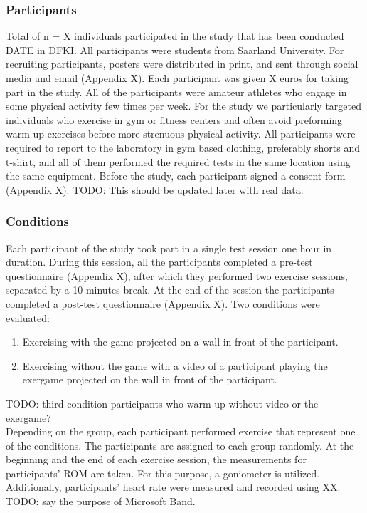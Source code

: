 \subsubsection{Participants}
Total of n = X individuals participated in the study that has been conducted DATE in DFKI. All participants were students from Saarland University. For recruiting participants, posters were distributed in print, and sent through social media and email (Appendix X). Each participant was given X euros for taking part in the study. All of the participants were amateur athletes who engage in some physical activity few times per week. For the study we particularly targeted individuals who exercise in gym or fitness centers and often avoid preforming warm up exercises before more strenuous physical activity. All participants were required to report to the laboratory in gym based
clothing, preferably shorts and t-shirt, and all of them performed the required tests in the same location using the same equipment. Before the study, each participant signed a consent form (Appendix X). TODO: This should be updated later with real data.
\subsubsection{Conditions}
Each participant of the study took part in a single test session one hour in duration. During this session, all the participants completed a pre-test questionnaire (Appendix X), after which they performed two exercise sessions, separated by a 10 minutes break. At the end of the session the participants completed a post-test questionnaire (Appendix X). Two conditions were evaluated:
\begin{enumerate}
\item Exercising with the game projected on a wall in front of the participant.
\item Exercising without the game with a video of a participant playing the exergame projected on the wall in front of the participant.
\end{enumerate}
TODO: third condition participants who warm up without video or the exergame?\\
Depending on the group, each participant performed exercise that represent one of the conditions. The participants are assigned to each group randomly.
At the beginning and the end of each exercise session, the measurements for participants' ROM are taken. For this purpose, a goniometer is utilized. Additionally, participants' heart rate were measured and recorded using XX. TODO: say the purpose of Microsoft Band. 
